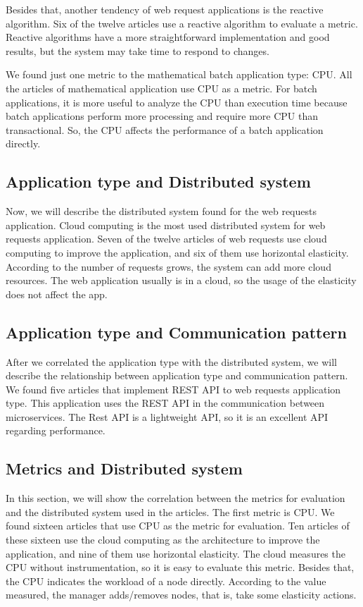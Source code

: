 Besides that, another tendency of web request applications is the reactive algorithm. Six of the twelve articles use a reactive algorithm to evaluate a metric. Reactive algorithms have a more straightforward implementation and good results, but the system may take time to respond to changes. 

We found just one metric to the mathematical batch application type: CPU. All the articles of mathematical application use CPU as a metric. For batch applications, it is more useful to analyze the CPU than execution time because batch applications perform more processing and require more CPU than transactional. So, the CPU affects the performance of a batch application directly.

\subsection{Application type and Distributed system}
Now, we will describe the distributed system found for the web requests application. Cloud computing is the most used distributed system for web requests application. Seven of the twelve articles of web requests use cloud computing to improve the application, and six of them use horizontal elasticity. According to the number of requests grows, the system can add more cloud resources. The web application usually is in a cloud, so the usage of the elasticity does not affect the app.

\subsection{Application type and Communication pattern}
After we correlated the application type with the distributed system, we will describe the relationship between application type and communication pattern. We found five articles that implement REST API to web requests application type. This application uses the REST API in the communication between microservices. The Rest API is a lightweight API, so it is an excellent API regarding performance.

\subsection{Metrics and Distributed system}
In this section, we will show the correlation between the metrics for evaluation and the distributed system used in the articles. The first metric is CPU. We found sixteen articles that use CPU as the metric for evaluation. Ten articles of these sixteen use the cloud computing as the architecture to improve the application, and nine of them use horizontal elasticity. The cloud measures the CPU without instrumentation, so it is easy to evaluate this metric. Besides that, the CPU indicates the workload of a node directly. According to the value measured, the manager adds/removes nodes, that is, take some elasticity actions.

